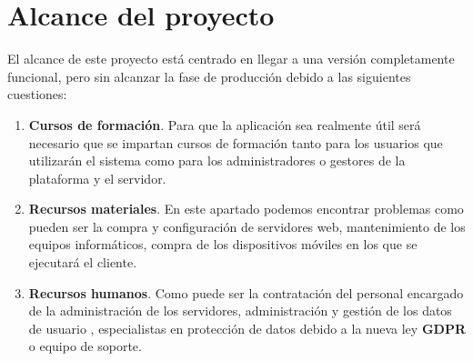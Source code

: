 \section{Alcance del proyecto}

El alcance de este proyecto está centrado en llegar a una versión completamente funcional,
pero sin alcanzar la fase de producción debido a las siguientes cuestiones:

\begin{enumerate}
    \item \textbf{Cursos de formación}. Para que la aplicación sea realmente útil será necesario
    que se impartan cursos de formación tanto para los usuarios que utilizarán el sistema
    como para los administradores o gestores de la plataforma y el servidor.

    \item \textbf{Recursos materiales}. En este apartado podemos encontrar problemas como pueden
    ser la compra y configuración de servidores web, mantenimiento de los equipos informáticos, 
    compra de los dispositivos móviles en los que se ejecutará el cliente.
    
    \item \textbf{Recursos humanos}. Como puede ser la contratación del personal encargado
    de la administración de los servidores, administración y gestión de los datos de usuario , especialistas en protección de datos debido a la nueva ley \textbf{GDPR} o equipo de soporte.

\end{enumerate}

